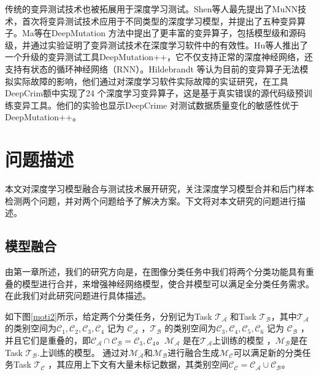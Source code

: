 \documentclass[fontset=macnew,UTF8]{article} %
\begin{document}
传统的变异测试技术也被拓展用于深度学习测试。Shen等人最先提出了MuNN技术\cite{shen2018munn}，首次将变异测试技术应用于不同类型的深度学习模型，并提出了五种变异算子。Ma等在DeepMutation 方法\cite{ma2018deepmutation}中提出了更丰富的变异算子，包括模型级和源码级，并通过实验证明了变异测试技术在深度学习软件中的有效性。Hu等人\cite{hu2019deepmutation++}推出了一个升级的变异测试工具DeepMutation++，它不仅支持正常的深度神经网络，还支持有状态的循环神经网络（RNN）。Hildebrandt 等认为目前的变异算子无法模拟实际故障的影响，他们通过对深度学习软件实际故障的实证研究，在工具DeepCrim额\cite{humbatova2021deepcrime}中实现了24 个深度学习变异算子，这是基于真实错误的源代码级预训练变异工具。他们的实验也显示DeepCrime 对测试数据质量变化的敏感性优于DeepMutation++。
	


\section{问题描述}
本文对深度学习模型融合与测试技术展开研究，关注深度学习模型合并和后门样本检测两个问题，并对两个问题给予了解决方案。下文将对本文研究的问题进行描述。

\subsection{模型融合}
由第一章所述，我们的研究方向是，在图像分类任务中我们将两个分类功能具有重叠的模型进行合并，来增强神经网络模型，使合并模型可以满足全分类任务需求。在此我们对此研究问题进行具体描述。

如下图\ref{moti2}所示，给定两个分类任务，分别记为Task $\mathcal{T}_\mathcal{A}$ 和Task $\mathcal{T}_\mathcal{B}$，其中$\mathcal{T}_\mathcal{A}$ 的类别空间为$\mathcal{C}_1, \mathcal{C}_2, \mathcal{C}_3, \mathcal{C}_4$ 记为 $\mathcal{C_A}$ ，$\mathcal{T_B}$ 的类别空间为$\mathcal{C}_3, \mathcal{C}_4, \mathcal{C}_5, \mathcal{C}_6$ 记为 $\mathcal{C_B}$ ，并且它们是重叠的，即$\mathcal{C_A}\cap \mathcal{C_B} =   {{\mathcal{C}_3,\mathcal{C}_4}}$。$\mathcal{M_A}$ 是在$\mathcal{T_A}$上训练的模型 ，$\mathcal{M_B}$是在Task $\mathcal{T_B}$.上训练的模型。 
通过对$\mathcal{M_A}$和$\mathcal{M_B}$进行融合生成$\mathcal{M_C}$可以满足新的分类任务Task $\mathcal{T_C}$ ，其应用上下文有大量未标记数据，其类别空间$\mathcal{C_C = C_A \cup C_B}$。
\end{document}
